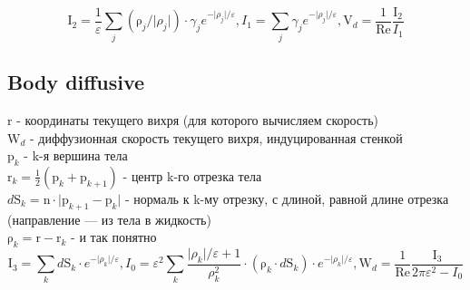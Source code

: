 \documentclass[14pt]{extreport}
\newcommand{\br}[1]{\boldsymbol{\mathrm{#1}}}
\newcommand{\Reyn}{\text{Re}}
\begin{document}
\begin{equation*}
\br I_2 = \dfrac{1}{\varepsilon}
\sum\limits_j (\br\rho_j / \lvert\rho_j\rvert)\cdot\gamma_j e^{-\lvert\rho_j\rvert/\varepsilon},
I_1 = {\sum\limits_j \gamma_j e^{-\lvert\rho_j\rvert/\varepsilon}},
\br V_d = \dfrac{1}{\Reyn} \dfrac{\br I_2}{I_1}
\end{equation*}

\begin{center}\setlength\fboxsep{0pt}
\setlength\fboxrule{0.5pt}
\end{center}

\subsection{Body diffusive}

$\br r$ - координаты текущего вихря (для которого вычисляем скорость) \\
$\br W_d$ - диффузионная скорость текущего вихря, индуцированная стенкой \\
$\br p_k$ - k-я вершина тела \\
$\br r_k = \frac{1}{2}(\br p_k + \br p_{k+1})$ - центр k-го отрезка тела \\
$d \br S_k = \br n \cdot\lvert\br p_{k+1} - \br p_k \rvert$ - нормаль к k-му отрезку, с длиной, равной длине отрезка (направление --- из тела в жидкость) \\
$\br{\rho}_k = \br r - \br r_k$ - и так понятно \\

\begin{equation*}
\br I_3 = {\sum\limits_k d\br S_k\cdot e^{-\lvert\rho_k\rvert/\varepsilon}},
I_0 = {\varepsilon^2\sum\limits_k \dfrac{\lvert\rho_k\rvert /\varepsilon +1}{\rho_k^2}
\cdot(\br\rho_k \cdot d\br S_k)\cdot e^{-\lvert\rho_k\rvert/\varepsilon}},
\br W_d = \dfrac{1}{\Reyn} \dfrac{\br I_3}{2\pi\varepsilon^2 - I_0}
\end{equation*}
\end{document}
